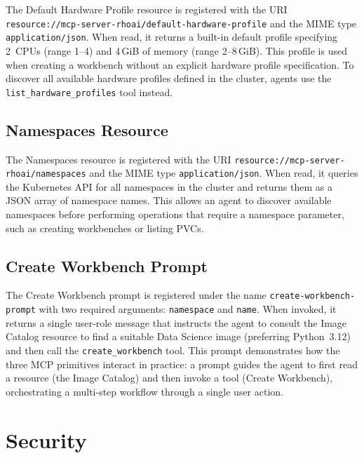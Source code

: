 \documentclass[
  digital,     %
  oneside,     %
  nosansbold,  %
  nocolorbold, %
  lof,         %
  lot,         %
]{fithesis4}
\begin{document}
\begin{sloppypar}
The Default Hardware Profile resource is registered with the URI
\texttt{resource://mcp-server-rhoai/\allowbreak default-hardware-profile} and the
MIME type \texttt{application/json}. When read, it returns a built-in
default profile specifying 2~CPUs (range 1--4) and 4\,GiB of memory
(range 2--8\,GiB). This profile is used when creating a workbench without
an explicit hardware profile specification. To discover all available
hardware profiles defined in the cluster, agents use the
\texttt{list\_hardware\_profiles} tool instead.
\end{sloppypar}

\subsection{Namespaces Resource}
\label{subsec:namespaces-resource}

\begin{sloppypar}
The Namespaces resource is registered with the URI
\texttt{resource://mcp-server-rhoai/\allowbreak namespaces} and the MIME type
\texttt{application/json}. When read, it queries the Kubernetes API for all
namespaces in the cluster and returns them as a JSON array of namespace names.
This allows an agent to discover available namespaces before performing
operations that require a namespace parameter, such as creating workbenches
or listing PVCs.
\end{sloppypar}

\subsection{Create Workbench Prompt}
\label{subsec:create-wb-prompt}

The Create Workbench prompt is registered under the name
\texttt{create-workbench-\allowbreak prompt} with two required arguments:
\texttt{namespace} and \texttt{name}. When invoked, it returns
a single user-role message that instructs the agent to consult the Image
Catalog resource to find a suitable Data Science image (preferring
Python~3.12) and then call the \texttt{create\_workbench} tool. This
prompt demonstrates how the three MCP primitives interact in practice: a
prompt guides the agent to first read a resource (the Image Catalog) and
then invoke a tool (Create Workbench), orchestrating a multi-step workflow
through a single user action.

\section{Security}
\label{sec:security}
\end{document}
